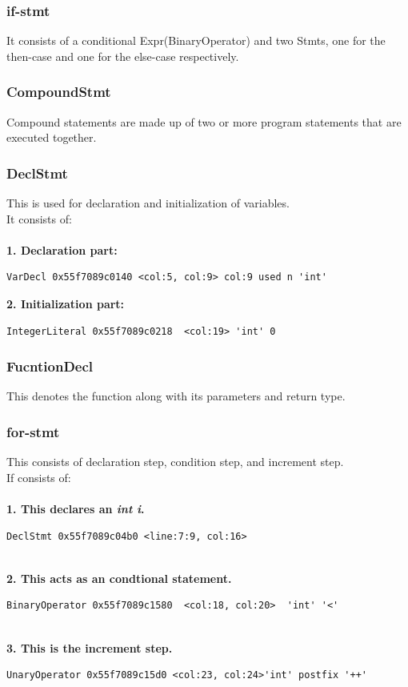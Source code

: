\documentclass{article}
\begin{document}
\subsubsection{if-stmt}
It consists of a conditional Expr(BinaryOperator) and two Stmts, one for the then-case and one for the else-case respectively.

\subsubsection{CompoundStmt}
Compound statements are made up of two or more program statements that are executed together.

\subsubsection{DeclStmt}
This is used for declaration and initialization of variables.\\
It consists of:\\
\\
\textbf{1. Declaration part:}
\begin{verbatim}
VarDecl 0x55f7089c0140 <col:5, col:9> col:9 used n 'int'
\end{verbatim}
\textbf{2. Initialization part:}
\begin{verbatim}
IntegerLiteral 0x55f7089c0218  <col:19> 'int' 0
\end{verbatim}

\subsubsection{FucntionDecl}
This denotes the function along with its parameters and return type.

\subsubsection{for-stmt}
This consists of declaration step, condition step, and increment step.\\
If consists of: \\
\\
\textbf{1. This declares an \textit{int i}.}
\begin{verbatim}
DeclStmt 0x55f7089c04b0 <line:7:9, col:16>
\end{verbatim}
\\
\textbf{2. This acts as an condtional statement.}
\begin{verbatim}
BinaryOperator 0x55f7089c1580  <col:18, col:20>  'int' '<'
\end{verbatim}
\\
\textbf{3. This is the increment step.}
\begin{verbatim}
UnaryOperator 0x55f7089c15d0 <col:23, col:24>'int' postfix '++'
\end{verbatim}
\end{document}
